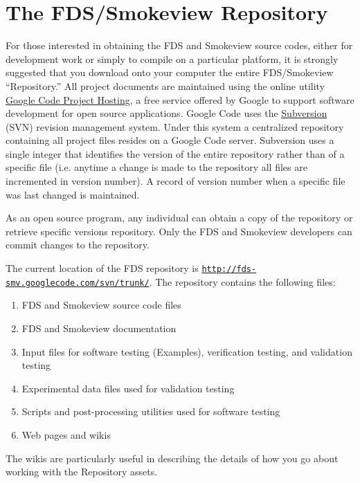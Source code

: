 \documentclass[11pt]{book}
\newcommand{\ct}{\tt\small}
\begin{document}
\chapter{The FDS/Smokeview Repository}

For those interested in obtaining the FDS and Smokeview source codes, either for development work or simply to compile on a particular platform,
it is strongly suggested that you download onto your computer the entire FDS/Smokeview ``Repository.''
All project documents are maintained using the online utility \href{http://code.google.com/opensource}{{Google Code Project Hosting}}, a free service offered
by Google to support software development for open source applications.  Google Code uses the \href{http://subversion.tigris.org}{{Subversion}} (SVN) revision management system.
Under this system a centralized repository containing all project files resides on a Google Code server.  Subversion uses a single integer that
identifies the version of the entire repository rather than of a specific file (i.e. anytime a change is made to the repository all files are incremented in version number).
A record of version number when a specific file was last changed is maintained.

As an open source program, any individual can obtain a copy of the repository or retrieve specific versions
repository.  Only the FDS and Smokeview developers can commit changes to the repository.

The current location of the FDS repository is \href{http://code.google.com/p/fds-smv/source/checkout}
{{\ct http://fds-smv.googlecode.com/svn/trunk/}}. The repository contains the following files:
\begin{enumerate}
\item FDS and Smokeview source code files
\item FDS and Smokeview documentation
\item Input files for software testing (Examples), verification testing, and validation testing
\item Experimental data files used for validation testing
\item Scripts and post-processing utilities used for software testing
\item Web pages and wikis
\end{enumerate}
The wikis are particularly useful in describing the details of how you go about working with the Repository assets.
\end{document}

